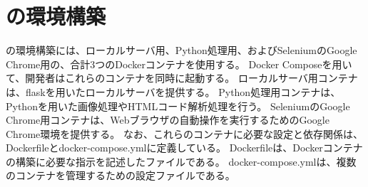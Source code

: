 \section{\toolName の環境構築}\label{sec:MixVRT_env_gen}
\toolName の環境構築には、ローカルサーバ用、Python処理用、およびSeleniumのGoogle Chrome用の、合計3つのDockerコンテナ\cite{Docker Container}を使用する。
Docker Compose\cite{Docker Compose}を用いて、開発者はこれらのコンテナを同時に起動する。
ローカルサーバ用コンテナは、flaskを用いたローカルサーバを提供する。
Python処理用コンテナは、Pythonを用いた画像処理やHTMLコード解析処理を行う。
SeleniumのGoogle Chrome用コンテナは、Webブラウザの自動操作を実行するためのGoogle Chrome環境を提供する。
なお、これらのコンテナに必要な設定と依存関係は、Dockerfileとdocker-compose.ymlに定義している。
Dockerfileは、Dockerコンテナの構築に必要な指示を記述したファイルである。
docker-compose.ymlは、複数のコンテナを管理するための設定ファイルである。